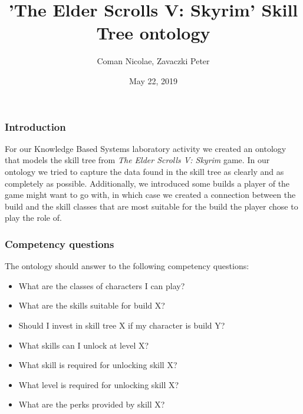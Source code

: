 \documentclass{beamer}
\title[Skyrim Skills ontology]{'The Elder Scrolls V: Skyrim' Skill Tree ontology}
\author{Coman Nicolae, Zavaczki Peter}
\institute[UTCN]
{
Department of Computer Science \\
Technical University of Cluj-Napoca \\
\medskip
\textit{ncoman32@yahoo.com\\peter.zavaczki@gmail.com}
}
\date{May 22, 2019}
\begin{document}
\begin{frame}
\titlepage
\end{frame}


\begin{frame}
\frametitle{Introduction}
For our Knowledge Based Systems laboratory activity we created an ontology that models the skill tree from \textit{The Elder Scrolls V: Skyrim} game.
\newline
\newline
In our ontology we tried to capture the data found in the skill tree as clearly and as completely as possible. Additionally, we introduced some builds a player of the game might want to go with, in which case we created a connection between the build and the skill classes that are most suitable for the build the player chose to play the role of.
\end{frame}


\begin{frame}
\frametitle{Competency questions}
The ontology should answer to the following competency questions:

\begin{itemize}
\item What are the classes of characters I can play?
\item What are the skills suitable for build X?
\item Should I invest in skill tree X if my character is build Y?
\item What skills can I unlock at level X?
\item What skill is required for unlocking skill X?
\item What level is required for unlocking skill X?
\item What are the perks provided by skill X?
\end{itemize}
\end{frame}

\end{document}
